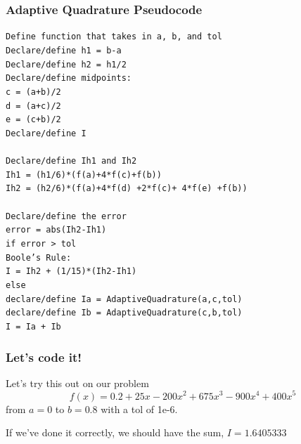 \documentclass{if-beamer}
\begin{document}
\begin{frame}
	\frametitle{Adaptive Quadrature Pseudocode}
	\texttt{Define function that takes in a, b, and tol}\\
	\texttt{Declare/define h1 = b-a}\\
	\texttt{Declare/define h2 = h1/2}\\
	\texttt{Declare/define midpoints: }\\
	\texttt{\quad c = (a+b)/2}\\
	\texttt{\quad d = (a+c)/2}\\
	\texttt{\quad e = (c+b)/2} \\
	\texttt{Declare/define I}\\
	\texttt{ }\\
	\texttt{Declare/define Ih1 and Ih2}\\
	\texttt{\quad Ih1 = (h1/6)*(f(a)+4*f(c)+f(b))}\\
	\texttt{\quad Ih2 = (h2/6)*(f(a)+4*f(d) +2*f(c)+ 4*f(e) +f(b))}\\
	\texttt{ }\\ 
	\texttt{Declare/define the error}\\
	\texttt{error = abs(Ih2-Ih1)}\\
	\texttt{if error > tol}\\
	\texttt{\qquad Boole's Rule:}\\
	\texttt{\qquad I = Ih2 + (1/15)*(Ih2-Ih1)}\\
	\texttt{else}\\
	\texttt{\qquad declare/define Ia = AdaptiveQuadrature(a,c,tol)}\\
	 \texttt{\qquad declare/define Ib = AdaptiveQuadrature(c,b,tol)}\\	
	 \texttt{\qquad I = Ia + Ib}\\
		
\end{frame}

\begin{frame}
	\frametitle{Let's code it!}
	Let's try this out on our problem
	$$f(x) = 0.2 + 25x-200x^2+675x^3-900x^4+400x^5$$ 
	from $a = 0$ to $b = 0.8$ with a tol of 1e-6. \\\vspace{10pt}
	
	If we've done it correctly, we should have the sum, $I = 1.6405333$
	
	
	
	
\end{frame}
\end{document}
